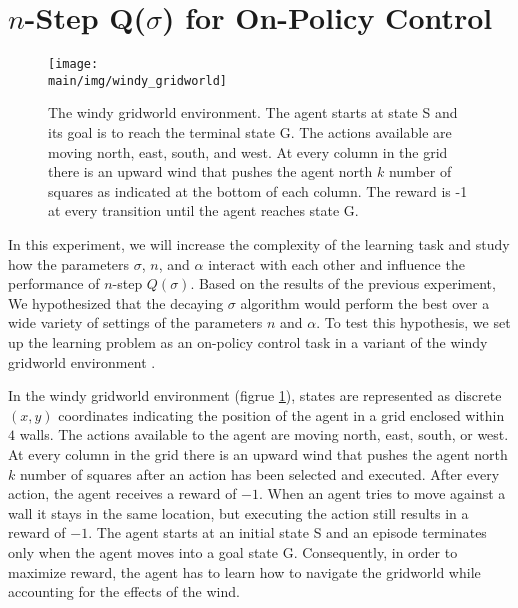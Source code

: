 \section{$n$-Step Q($\sigma$) for On-Policy Control}

\begin{figure}[t]
    \centering
    \texttt{[image: \\main/img/windy\_gridworld]}
    \caption[The Windy Gridworld Environment] {
    The windy gridworld environment.
    The agent starts at state S and its goal is to reach the terminal state G.
    The actions available are moving north, east, south, and west.
    At every column in the grid there is an upward wind that pushes the agent north $k$ number of squares as indicated at the bottom of each column.
    The reward is -1 at every transition until the agent reaches state G.
    }
    \label{fig:windy_gridworld}
\end{figure}

In this experiment, we will increase the complexity of the learning task and study how the parameters $\sigma$, $n$, and $\alpha$ interact with each other and influence the performance of $n$-step $Q(\sigma)$.
Based on the results of the previous experiment, We hypothesized that the decaying $\sigma$ algorithm would perform the best over a wide variety of settings of the parameters $n$ and $\alpha$.
To test this hypothesis, we set up the learning problem as an on-policy control task in a variant of the windy gridworld environment \parencite{harm-hado-expected-sarsa, Sutton:1998:IRL:551283}.

In the windy gridworld environment (figrue \ref{fig:windy_gridworld}), states are represented as discrete $(x,y)$ coordinates indicating the position of the agent in a grid enclosed within $4$ walls.
The actions available to the agent are moving north, east, south, or west.
At every column in the grid there is an upward wind that pushes the agent north $k$ number of squares after an action has been selected and executed.
After every action, the agent receives a reward of $-1$.
When an agent tries to move against a wall it stays in the same location, but executing the action still results in a reward of $-1$.
The agent starts at an initial state S and an episode terminates only when the agent moves into a goal state G.
Consequently, in order to maximize reward, the agent has to learn how to navigate the gridworld while accounting for the effects of the wind.

